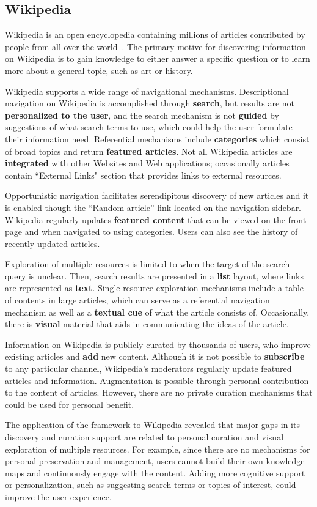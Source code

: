 \documentclass{sigchi}
\begin{document}
{\subsection{Wikipedia}
Wikipedia is an open encyclopedia containing millions of articles contributed by people from all over the world~\cite{kittur2007power,volkel2006semantic}. The primary motive for discovering information on Wikipedia is to gain knowledge to either answer a specific question or to learn more about a general topic, such as art or history.



Wikipedia supports a wide range of navigational mechanisms. Descriptional navigation on Wikipedia is accomplished through \textbf{search}, but results are not \textbf{personalized to the user}, and the search mechanism is not \textbf{guided} by suggestions of what search terms to use, which could help the user formulate their information need. Referential mechanisms include \textbf{categories} which consist of broad topics and return \textbf{featured articles}. Not all Wikipedia articles are \textbf{integrated} with other Websites and Web applications; occasionally articles contain ``External Links" section that provides links to external resources. 

Opportunistic navigation facilitates serendipitous discovery of new articles and it is enabled though the ``Random article'' link located on the navigation sidebar. Wikipedia regularly updates \textbf{featured content} that can be viewed on the front page and when navigated to using categories. Users can also see the history of recently updated articles. 

Exploration of multiple resources is limited to when the target of the search query is unclear. Then, search results are presented in a \textbf{list} layout, where links are represented as \textbf{text}. Single resource exploration mechanisms include a table of contents in large articles, which can serve as a referential navigation mechanism as well as a \textbf{textual cue} of what the article consists of. Occasionally, there is \textbf{visual} material that aids in communicating the ideas of the article.  

Information on Wikipedia is publicly curated by thousands of users, who improve existing articles and \textbf{add} new content. Although it is not possible to \textbf{subscribe} to any particular channel, Wikipedia's moderators regularly update featured articles and information. Augmentation is possible through personal contribution to the content of articles. However, there are no private curation mechanisms that could be used for personal benefit. 

The application of the framework to Wikipedia revealed that major gaps in its discovery and curation support are related to personal curation and visual exploration of multiple resources. For example, since there are no mechanisms for personal preservation and management, users cannot build their own knowledge maps and continuously engage with the content. Adding more cognitive support or personalization, such as suggesting search terms or topics of interest, could improve the user experience.

} %
\end{document}
